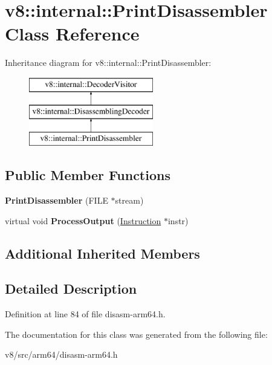 \hypertarget{classv8_1_1internal_1_1PrintDisassembler}{}\section{v8\+:\+:internal\+:\+:Print\+Disassembler Class Reference}
\label{classv8_1_1internal_1_1PrintDisassembler}
Inheritance diagram for v8\+:\+:internal\+:\+:Print\+Disassembler\+:\begin{figure}[H]
\begin{center}
\leavevmode
\includegraphics[height=3.000000cm]{classv8_1_1internal_1_1PrintDisassembler}
\end{center}
\end{figure}
\subsection*{Public Member Functions}
\begin{DoxyCompactItemize}
\item 
\mbox{\label{classv8_1_1internal_1_1PrintDisassembler_ab5104bb021b6be0bff543d3210c234ed}} 
{\bfseries Print\+Disassembler} (F\+I\+LE $\ast$stream)
\item 
\mbox{\label{classv8_1_1internal_1_1PrintDisassembler_a033c57b8b49dd172975c7d0946d039d5}} 
virtual void {\bfseries Process\+Output} (\mbox{\hyperlink{classv8_1_1internal_1_1Instruction}{Instruction}} $\ast$instr)
\end{DoxyCompactItemize}
\subsection*{Additional Inherited Members}


\subsection{Detailed Description}


Definition at line 84 of file disasm-\/arm64.\+h.



The documentation for this class was generated from the following file\+:\begin{DoxyCompactItemize}
\item 
v8/src/arm64/disasm-\/arm64.\+h\end{DoxyCompactItemize}

